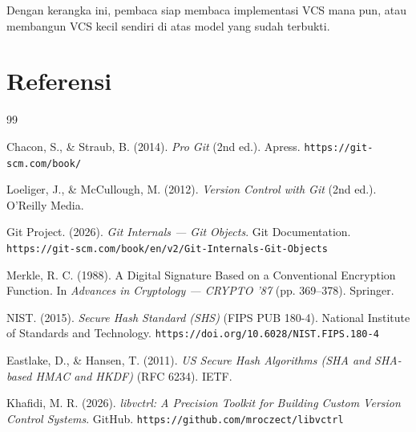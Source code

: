 \documentclass[11pt,a4paper]{article}
\begin{document}
Dengan kerangka ini, pembaca siap membaca implementasi VCS mana pun, atau membangun VCS kecil sendiri di atas model yang sudah terbukti.

\newpage
\section*{Referensi}

\begin{thebibliography}{99}

	Chacon, S., \& Straub, B. (2014).
	\textit{Pro Git} (2nd ed.).
	Apress.
	\texttt{https://git-scm.com/book/}

	Loeliger, J., \& McCullough, M. (2012).
	\textit{Version Control with Git} (2nd ed.).
	O'Reilly Media.

	Git Project. (2026).
	\textit{Git Internals --- Git Objects}.
	Git Documentation.
	\texttt{https://git-scm.com/book/en/v2/Git-Internals-Git-Objects}

	Merkle, R. C. (1988).
	A Digital Signature Based on a Conventional Encryption Function.
	In \textit{Advances in Cryptology --- CRYPTO '87}
	(pp. 369--378). Springer.

	NIST. (2015).
	\textit{Secure Hash Standard (SHS)} (FIPS PUB 180-4).
	National Institute of Standards and Technology.
	\texttt{https://doi.org/10.6028/NIST.FIPS.180-4}

	Eastlake, D., \& Hansen, T. (2011).
	\textit{US Secure Hash Algorithms (SHA and SHA-based HMAC and HKDF)} (RFC 6234). IETF.

	Khafidi, M. R. (2026).
	\textit{libvctrl: A Precision Toolkit for Building Custom Version Control Systems}.
	GitHub.
	\texttt{https://github.com/mroczect/libvctrl}

\end{thebibliography}
\end{document}
